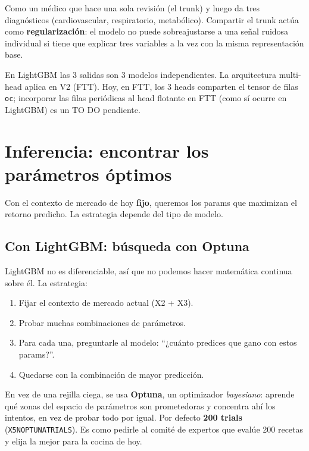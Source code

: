 \documentclass[11pt,a4paper]{report}
\newcommand{\code}[1]{\texttt{\def\_{\textunderscore\allowbreak}#1}}
\begin{document}
\begin{idea}
Como un médico que hace una sola revisión (el trunk) y luego da tres diagnósticos
(cardiovascular, respiratorio, metabólico). Compartir el trunk actúa como \textbf{regularización}:
el modelo no puede sobreajustarse a una señal ruidosa individual si tiene que explicar tres
variables a la vez con la misma representación base.
\end{idea}

\begin{nota}
En LightGBM las 3 salidas son 3 modelos independientes. La arquitectura multi-head aplica en
V2 (FTT). Hoy, en FTT, los 3 heads comparten el tensor de filas \code{oc}; incorporar las filas
periódicas al head flotante en FTT (como sí ocurre en LightGBM) es un TO DO pendiente.
\end{nota}

\chapter{Inferencia: encontrar los parámetros óptimos}

Con el contexto de mercado de hoy \textbf{fijo}, queremos los params que maximizan el retorno
predicho. La estrategia depende del tipo de modelo.

\section{Con LightGBM: búsqueda con Optuna}

LightGBM no es diferenciable, así que no podemos hacer matemática continua sobre él. La estrategia:

\begin{enumerate}[leftmargin=1.5em, itemsep=1pt]
  \item Fijar el contexto de mercado actual (X2 + X3).
  \item Probar muchas combinaciones de parámetros.
  \item Para cada una, preguntarle al modelo: ``¿cuánto predices que gano con estos params?''.
  \item Quedarse con la combinación de mayor predicción.
\end{enumerate}

En vez de una rejilla ciega, se usa \textbf{Optuna}, un optimizador \emph{bayesiano}: aprende qué
zonas del espacio de parámetros son prometedoras y concentra ahí los intentos, en vez de probar
todo por igual. Por defecto \textbf{200 trials} (\code{X5\_N\_OPTUNA\_TRIALS}). Es como pedirle al
comité de expertos que evalúe 200 recetas y elija la mejor para la cocina de hoy.
\end{document}
